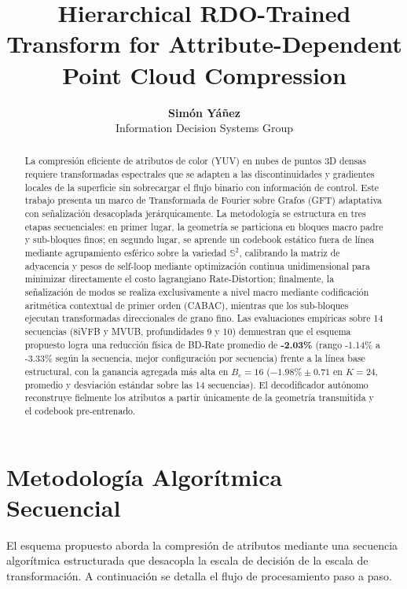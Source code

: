 \documentclass[11pt,a4paper]{article}
\title{\textbf{Hierarchical RDO-Trained Transform for Attribute-Dependent Point Cloud Compression}}
\author{\textbf{Simón Yáñez} \\ Information Decision Systems Group}
\date{}
\begin{document}
\maketitle

\begin{abstract}
La compresión eficiente de atributos de color (YUV) en nubes de puntos 3D densas requiere transformadas espectrales que se adapten a las discontinuidades y gradientes locales de la superficie sin sobrecargar el flujo binario con información de control. Este trabajo presenta un marco de Transformada de Fourier sobre Grafos (GFT) adaptativa con señalización desacoplada jerárquicamente. La metodología se estructura en tres etapas secuenciales: en primer lugar, la geometría se particiona en bloques macro padre y sub-bloques finos; en segundo lugar, se aprende un codebook estático fuera de línea mediante agrupamiento esférico sobre la variedad $\mathbb{S}^2$, calibrando la matriz de adyacencia y pesos de self-loop mediante optimización continua unidimensional para minimizar directamente el costo lagrangiano Rate-Distortion; finalmente, la señalización de modos se realiza exclusivamente a nivel macro mediante codificación aritmética contextual de primer orden (CABAC), mientras que los sub-bloques ejecutan transformadas direccionales de grano fino. Las evaluaciones empíricas sobre 14 secuencias (8iVFB y MVUB, profundidades 9 y 10) demuestran que el esquema propuesto logra una reducción física de BD-Rate promedio de \textbf{-2.03\%} (rango -1.14\% a -3.33\% según la secuencia, mejor configuración por secuencia) frente a la línea base estructural, con la ganancia agregada más alta en $B_c=16$ ($-1.98\% \pm 0.71$ en $K=24$, promedio y desviación estándar sobre las 14 secuencias). El decodificador autónomo reconstruye fielmente los atributos a partir únicamente de la geometría transmitida y el codebook pre-entrenado.
\end{abstract}

\section{Metodología Algorítmica Secuencial}

El esquema propuesto aborda la compresión de atributos mediante una secuencia algorítmica estructurada que desacopla la escala de decisión de la escala de transformación. A continuación se detalla el flujo de procesamiento paso a paso.
\end{document}
